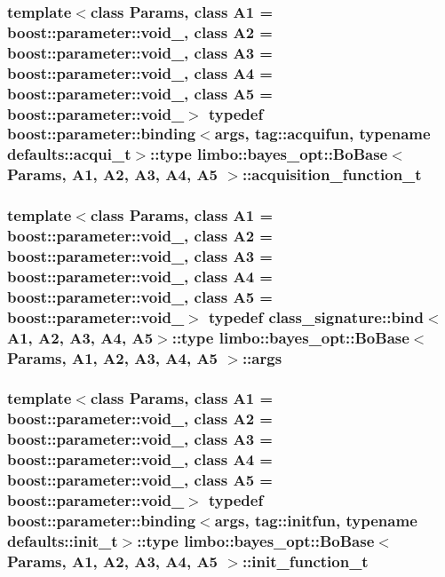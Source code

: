 \subsubsection[{acquisition\+\_\+function\+\_\+t}]{\setlength{\rightskip}{0pt plus 5cm}template$<$class Params, class A1 = boost\+::parameter\+::void\+\_\+, class A2 = boost\+::parameter\+::void\+\_\+, class A3 = boost\+::parameter\+::void\+\_\+, class A4 = boost\+::parameter\+::void\+\_\+, class A5 = boost\+::parameter\+::void\+\_\+$>$ typedef boost\+::parameter\+::binding$<${\bf args}, tag\+::acquifun, typename {\bf defaults\+::acqui\+\_\+t}$>$\+::type {\bf limbo\+::bayes\+\_\+opt\+::\+Bo\+Base}$<$ Params, A1, A2, A3, A4, A5 $>$\+::{\bf acquisition\+\_\+function\+\_\+t}}\label{classlimbo_1_1bayes__opt_1_1_bo_base_a02b14991b62e0f8c9bcf834220ed62e4}
\hypertarget{classlimbo_1_1bayes__opt_1_1_bo_base_a75c1ae9e7268016c6f767c56bcede7d2}{}
\subsubsection[{args}]{\setlength{\rightskip}{0pt plus 5cm}template$<$class Params, class A1 = boost\+::parameter\+::void\+\_\+, class A2 = boost\+::parameter\+::void\+\_\+, class A3 = boost\+::parameter\+::void\+\_\+, class A4 = boost\+::parameter\+::void\+\_\+, class A5 = boost\+::parameter\+::void\+\_\+$>$ typedef class\+\_\+signature\+::bind$<$A1, A2, A3, A4, A5$>$\+::type {\bf limbo\+::bayes\+\_\+opt\+::\+Bo\+Base}$<$ Params, A1, A2, A3, A4, A5 $>$\+::{\bf args}}\label{classlimbo_1_1bayes__opt_1_1_bo_base_a75c1ae9e7268016c6f767c56bcede7d2}
\hypertarget{classlimbo_1_1bayes__opt_1_1_bo_base_aa4cf2b36051de6b46e75621f0b9ed642}{}
\subsubsection[{init\+\_\+function\+\_\+t}]{\setlength{\rightskip}{0pt plus 5cm}template$<$class Params, class A1 = boost\+::parameter\+::void\+\_\+, class A2 = boost\+::parameter\+::void\+\_\+, class A3 = boost\+::parameter\+::void\+\_\+, class A4 = boost\+::parameter\+::void\+\_\+, class A5 = boost\+::parameter\+::void\+\_\+$>$ typedef boost\+::parameter\+::binding$<${\bf args}, tag\+::initfun, typename {\bf defaults\+::init\+\_\+t}$>$\+::type {\bf limbo\+::bayes\+\_\+opt\+::\+Bo\+Base}$<$ Params, A1, A2, A3, A4, A5 $>$\+::{\bf init\+\_\+function\+\_\+t}}\label{classlimbo_1_1bayes__opt_1_1_bo_base_aa4cf2b36051de6b46e75621f0b9ed642}
\hypertarget{classlimbo_1_1bayes__opt_1_1_bo_base_a1ddc93cc023a2d7d527deb4cc750624e}{}
